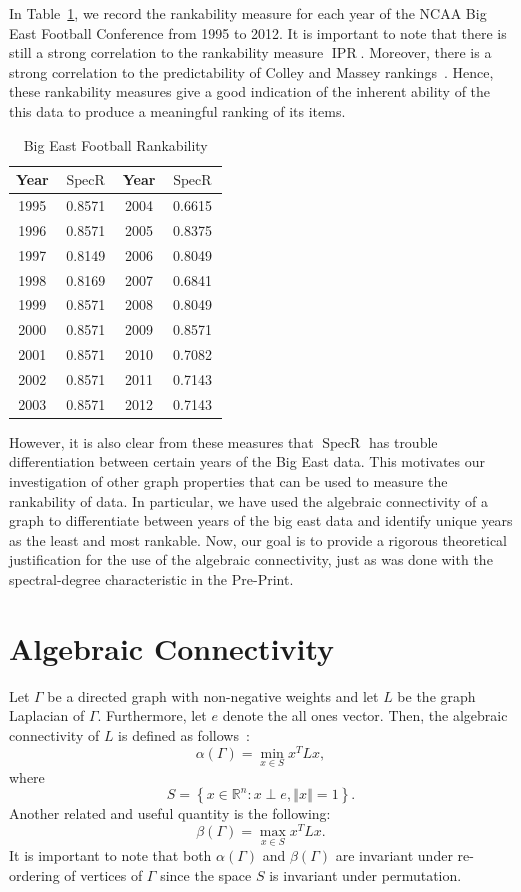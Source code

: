 \documentclass{article}
\newcommand\norm[1]{\left\Vert#1\right\Vert}
\DeclareMathOperator{\specr}{SpecR}
\DeclareMathOperator{\ipr}{IPR}
\begin{document}
In Table~\ref{tab:big-east}, we record the rankability measure for each year of the NCAA Big East Football Conference from 1995 to 2012.
It is important to note that there is still a strong correlation to the rankability measure $\ipr$.
Moreover, there is a strong correlation to the predictability of Colley and Massey rankings~\cite{Colley2002,Massey1997}.
Hence, these rankability measures give a good indication of the inherent ability of the this data to produce a meaningful ranking of its items.
\begin{table}
\centering
\begin{tabular}{|| c | c || c | c ||}
\hline
Year & $\specr$ & Year & $\specr$ \\
\hline
1995 & 0.8571 & 2004 & 0.6615\\
1996 & 0.8571 & 2005 & 0.8375\\
1997 & 0.8149 & 2006 & 0.8049\\
1998 & 0.8169 & 2007 & 0.6841\\
1999 & 0.8571 & 2008 & 0.8049\\
2000 & 0.8571 & 2009 & 0.8571\\
2001 & 0.8571 & 2010 & 0.7082\\ 
2002 & 0.8571 & 2011 & 0.7143\\
2003 & 0.8571 & 2012 & 0.7143\\
\hline
\end{tabular}
\caption{Big East Football Rankability}
\label{tab:big-east}
\end{table}

However, it is also clear from these measures that $\specr$ has trouble differentiation between certain years of the Big East data. 
This motivates our investigation of other graph properties that can be used to measure the rankability of data. 
In particular, we have used the algebraic connectivity of a graph to differentiate between years of the big east data and identify unique years as the least and most rankable. 
Now, our goal is to provide a rigorous theoretical justification for the use of the algebraic connectivity, just as was done with the spectral-degree characteristic in the Pre-Print. 

\section{Algebraic Connectivity}	
Let $\Gamma$ be a directed graph with non-negative weights and let $L$ be the graph Laplacian of $\Gamma$. 
Furthermore, let $e$ denote the all ones vector. 
Then, the algebraic connectivity of $L$ is defined as follows~\cite{Wu2005-1}:
\[
\alpha(\Gamma)=\min_{x\in S}x^{T}Lx,
\]
where
\[
S=\left\{x\in\mathbb{R}^{n}\colon x\perp e,\norm{x}=1\right\}.
\]
Another related and useful quantity is the following:
\[
\beta(\Gamma)=\max_{x\in S}x^{T}Lx.
\]
It is important to note that both $\alpha(\Gamma)$ and $\beta(\Gamma)$ are invariant under re-ordering of vertices of $\Gamma$ since the space $S$ is invariant under permutation. 
\end{document}
